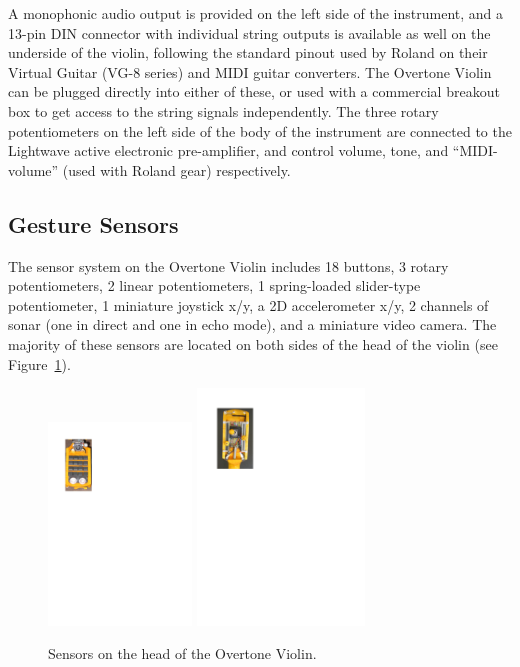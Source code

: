 A monophonic audio output is provided on the left side of the instrument, and a
13-pin DIN connector with individual string outputs is available as well on the
underside of the violin, following the standard pinout used by Roland on their
Virtual Guitar (VG-8 series) and MIDI guitar converters. The Overtone Violin can
be plugged directly into either of these, or used with a commercial breakout box
to get access to the string signals independently. The three rotary
potentiometers on the left side of the body of the instrument are connected to
the Lightwave active electronic pre-amplifier, and control volume, tone, and
``MIDI-volume'' (used with Roland gear) respectively.

\subsection{Gesture Sensors}

The sensor system on the Overtone Violin includes 18 buttons, 3 rotary
potentiometers, 2 linear potentiometers, 1 spring-loaded slider-type
potentiometer, 1 miniature joystick x/y, a 2D accelerometer x/y, 2 channels of
sonar (one in direct and one in echo mode), and a miniature video camera. The
majority of these sensors are located on both sides of the head of the violin
(see Figure~\ref{Overholt:fig:3}).

\begin{figure}[t]
\centering
\includegraphics[width=108pt]{img-3-eps-converted-to.pdf}  
\includegraphics[width=126pt]{img-4-eps-converted-to.pdf}
\caption{Sensors on the head of the Overtone Violin.}
\label{Overholt:fig:3} 
\end{figure}

